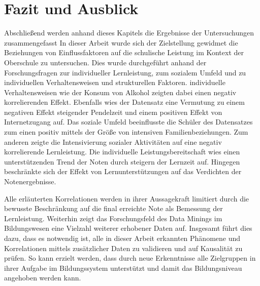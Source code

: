 \chapter[Fazit und Ausblick]{Fazit und Ausblick}

Abschließend werden anhand dieses Kapitels die Ergebnisse der Untersuchungen zusammengefasst
In dieser Arbeit wurde sich der Zielstellung gewidmet die Beziehungen von Einflussfaktoren auf die schulische Leistung im Kontext der Oberschule zu untersuchen.
Dies wurde durchgeführt anhand der Forschungsfragen zur individueller Lernleistung, zum sozialem Umfeld und zu individuellen Verhaltensweisen und strukturellen Faktoren.
individuelle Verhaltensweisen wie der Konsum von Alkohol zeigten dabei einen negativ korrelierenden Effekt.
Ebenfalls wies der Datensatz eine Vermutung zu einem negativen Effekt steigender Pendelzeit und einem positiven Effekt von Internetzugang auf.
Das soziale Umfeld beeinflusste die Schüler des Datensatzes zum einen positiv mittels der Größe von intensiven Familienbeziehungen.
Zum anderen zeigte die Intensivierung sozialer Aktivitäten auf eine negativ korrelierende Lernleistung.
Die individuelle Leistungsbereitschaft wies einen unterstützenden Trend der Noten durch steigern der Lernzeit auf. 
Hingegen beschränkte sich der Effekt von Lernunterstützungen auf das Verdichten der Notenergebnisse.

Alle erläuterten Korrelationen werden in ihrer Aussagekraft limitiert durch die bewusste Beschränkung auf die final erreichte Note als Bemessung der Lernleistung.
Weiterhin zeigt das Forschungsfeld des Data Minings im Bildungswesen eine Vielzahl weiterer erhobener Daten auf.
Insgesamt führt dies dazu, dass es notwendig ist, alle in dieser Arbeit erkannten Phänomene und Korrelationen mittels zusätzlicher Daten zu validieren und auf Kausalität zu prüfen.
So kann erzielt werden, dass durch neue Erkenntnisse alle Zielgruppen in ihrer Aufgabe im Bildungssystem unterstützt und damit das Bildungsniveau angehoben werden kann.